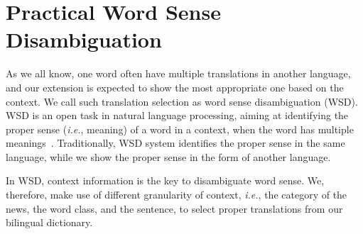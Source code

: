 \section{Practical Word Sense Disambiguation}
\label{sec:wds}
\begin{CJK}{UTF8}{gbsn}

As we all know, one word often have multiple translations in another language, and our extension is expected to show the most appropriate one based on the context. We call such translation selection as word sense disambiguation (WSD). WSD is an open task in natural language processing, aiming at identifying the proper sense ({\it i.e.}, meaning) of a word  in a context, when the word has multiple meanings~\cite{Navigli2009}. Traditionally, WSD system identifies the proper sense in the same language, while we show the proper sense in the form of another language.

In WSD, context information is the key to disambiguate word sense. We, therefore, make use of different granularity of context, {\it i.e.}, the category of the news, the word class, and the sentence, to select proper translations from our bilingual dictionary.


                                                         

\end{CJK}

